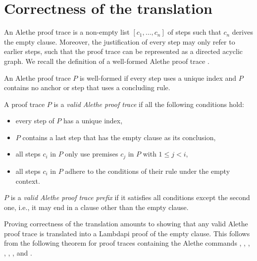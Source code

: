 \section{Correctness of the translation}
\label{sect:soundness}

An Alethe proof trace is a non-empty list $[c_1, \dots, c_n]$ of steps such that $c_n$ derives the empty clause. Moreover, the justification of every step may only refer to earlier steps, such that the proof trace can be represented as a directed acyclic graph. We recall the definition of a well-formed Alethe proof trace \cite[Def.\ 7.2]{alethespec}.

\smallskip

\begin{definition}
An Alethe proof trace $P$ is well-formed if every step uses a unique index and $P$ contains no anchor or step that uses a concluding rule.
\end{definition}

\smallskip

\begin{definition} 
  A proof trace $P$ is a \emph{valid Alethe proof trace} if all the following conditions hold:
  \begin{itemize}
  \item every step of $P$ has a unique index,
  \item $P$ contains a last step that has the empty clause as its conclusion,
  \item all steps $c_i$ in $P$ only use premises $c_j$ in $P$ with $1 \leq j < i$,
  \item all steps $c_i$ in $P$ adhere to the conditions of their rule under the empty context.
  \end{itemize}
  $P$ is a \emph{valid Alethe proof trace prefix} if it satisfies all conditions except the second one, i.e., it may end in a clause other than the empty clause.
\end{definition}

\smallskip 

Proving correctness of the translation amounts to showing that any valid Alethe proof trace is translated into a Lambdapi proof of the empty clause. This follows from the following theorem for proof traces containing the Alethe commands , , , , , , and .

\smallskip

